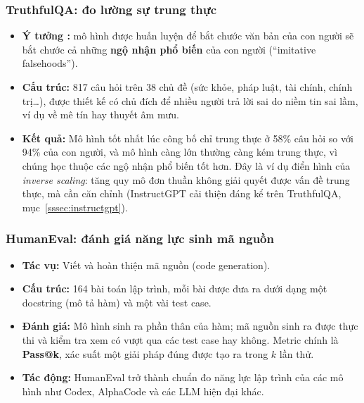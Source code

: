 \subsubsection{TruthfulQA: đo lường sự trung thực}
\label{sssec:truthfulqa}
\begin{itemize}
	\item \textbf{Ý tưởng \cite{lin2022truthfulqa}:} mô hình được huấn luyện để bắt chước văn bản của con người sẽ bắt chước cả những \textbf{ngộ nhận phổ biến} của con người (“imitative falsehoods”).
	\item \textbf{Cấu trúc:} 817 câu hỏi trên 38 chủ đề (sức khỏe, pháp luật, tài chính, chính trị\ldots), được thiết kế có chủ đích để nhiều người trả lời sai do niềm tin sai lầm, ví dụ về mê tín hay thuyết âm mưu.
	\item \textbf{Kết quả:} Mô hình tốt nhất lúc công bố chỉ trung thực ở 58\% câu hỏi so với 94\% của con người, và mô hình càng lớn thường càng kém trung thực, vì chúng học thuộc các ngộ nhận phổ biến tốt hơn. Đây là ví dụ điển hình của \emph{inverse scaling}: tăng quy mô đơn thuần không giải quyết được vấn đề trung thực, mà cần căn chỉnh (InstructGPT cải thiện đáng kể trên TruthfulQA, mục~\ref{sssec:instructgpt}).
\end{itemize}

\subsubsection{HumanEval: đánh giá năng lực sinh mã nguồn}
\begin{itemize}
    \item \textbf{Tác vụ:} Viết và hoàn thiện mã nguồn (code generation).
    \item \textbf{Cấu trúc:} 164 bài toán lập trình, mỗi bài được đưa ra dưới dạng một docstring (mô tả hàm) và một vài test case.
    \item \textbf{Đánh giá:} Mô hình sinh ra phần thân của hàm; mã nguồn sinh ra được thực thi và kiểm tra xem có vượt qua các test case hay không. Metric chính là \textbf{Pass@k}, xác suất một giải pháp đúng được tạo ra trong $k$ lần thử.
    \item \textbf{Tác động:} HumanEval trở thành chuẩn đo năng lực lập trình của các mô hình như Codex, AlphaCode và các LLM hiện đại khác.
\end{itemize}

\begin{center}
\label{fig:llm_benchmarks_timeline}
\end{center}

